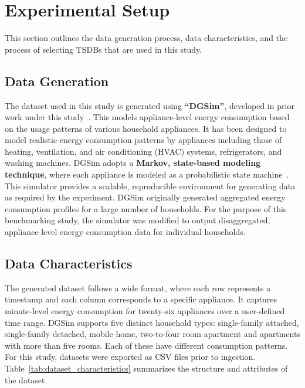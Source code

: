 \documentclass[conference]{IEEEtran}
\begin{document}
\section{Experimental Setup}\label{sec:setup}
This section outlines the data generation process, data characteristics, and the process of selecting TSDBs that are used in this study.
\subsection{Data Generation}
The dataset used in this study is generated using \textbf{``DGSim''}, developed in prior work under this study~\cite{17_DGSim}. This models appliance-level energy consumption based on the usage patterns of various household appliances. It has been designed to model realistic energy consumption patterns by appliances including those of heating, ventilation, and air conditioning (HVAC) systems, refrigerators, and washing machines. DGSim adopts a \textbf{Markov, state-based modeling technique}, where each appliance is modeled as a probabilistic state machine~\cite{12_zucchini2016hmm}. This simulator provides a scalable, reproducible environment for generating data as required by the experiment. 
DGSim originally generated aggregated energy consumption profiles for a large number of households. For the purpose of this benchmarking study, the simulator was modified to output disaggregated, appliance-level energy consumption data for individual households.
\subsection{Data Characteristics}
The generated dataset follows a wide format, where each row represents a timestamp and each column corresponds to a specific appliance. It captures minute-level energy consumption for twenty-six appliances over a user-defined time range. DGSim supports five distinct household types: single-family attached, single-family detached, mobile home, two-to-four room apartment and apartments with more than five rooms. Each of these have different consumption patterns.
For this study, datasets were exported as CSV files prior to ingestion. Table~\ref{tab:dataset_characteristics} summarizes the structure and attributes of the dataset.
\end{document}
